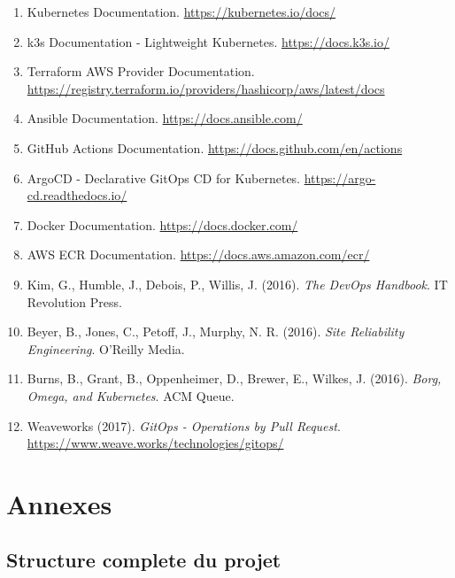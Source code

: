 \documentclass[12pt,a4paper,french]{report}
\begin{document}
\begin{enumerate}
    \item Kubernetes Documentation. \url{https://kubernetes.io/docs/}
    \item k3s Documentation - Lightweight Kubernetes. \url{https://docs.k3s.io/}
    \item Terraform AWS Provider Documentation. \url{https://registry.terraform.io/providers/hashicorp/aws/latest/docs}
    \item Ansible Documentation. \url{https://docs.ansible.com/}
    \item GitHub Actions Documentation. \url{https://docs.github.com/en/actions}
    \item ArgoCD - Declarative GitOps CD for Kubernetes. \url{https://argo-cd.readthedocs.io/}
    \item Docker Documentation. \url{https://docs.docker.com/}
    \item AWS ECR Documentation. \url{https://docs.aws.amazon.com/ecr/}
    \item Kim, G., Humble, J., Debois, P., Willis, J. (2016). \textit{The DevOps Handbook}. IT Revolution Press.
    \item Beyer, B., Jones, C., Petoff, J., Murphy, N. R. (2016). \textit{Site Reliability Engineering}. O'Reilly Media.
    \item Burns, B., Grant, B., Oppenheimer, D., Brewer, E., Wilkes, J. (2016). \textit{Borg, Omega, and Kubernetes}. ACM Queue.
    \item Weaveworks (2017). \textit{GitOps - Operations by Pull Request}. \url{https://www.weave.works/technologies/gitops/}
\end{enumerate}

\appendix
\chapter{Annexes}

\section{Structure complete du projet}
\end{document}
